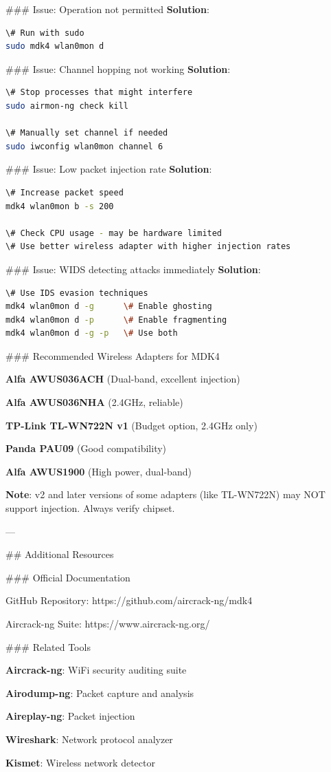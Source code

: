 \documentclass[11pt,a4paper]{article}
\begin{document}
\#\#\# Issue: Operation not permitted
\textbf{Solution}:
\begin{lstlisting}[language=bash]
\# Run with sudo
sudo mdk4 wlan0mon d
\end{lstlisting}

\#\#\# Issue: Channel hopping not working
\textbf{Solution}:
\begin{lstlisting}[language=bash]
\# Stop processes that might interfere
sudo airmon-ng check kill

\# Manually set channel if needed
sudo iwconfig wlan0mon channel 6
\end{lstlisting}

\#\#\# Issue: Low packet injection rate
\textbf{Solution}:
\begin{lstlisting}[language=bash]
\# Increase packet speed
mdk4 wlan0mon b -s 200

\# Check CPU usage - may be hardware limited
\# Use better wireless adapter with higher injection rates
\end{lstlisting}

\#\#\# Issue: WIDS detecting attacks immediately
\textbf{Solution}:
\begin{lstlisting}[language=bash]
\# Use IDS evasion techniques
mdk4 wlan0mon d -g      \# Enable ghosting
mdk4 wlan0mon d -p      \# Enable fragmenting
mdk4 wlan0mon d -g -p   \# Use both
\end{lstlisting}

\#\#\# Recommended Wireless Adapters for MDK4
\item \textbf{Alfa AWUS036ACH} (Dual-band, excellent injection)
\item \textbf{Alfa AWUS036NHA} (2.4GHz, reliable)
\item \textbf{TP-Link TL-WN722N v1} (Budget option, 2.4GHz only)
\item \textbf{Panda PAU09} (Good compatibility)
\item \textbf{Alfa AWUS1900} (High power, dual-band)

\textbf{Note}: v2 and later versions of some adapters (like TL-WN722N) may NOT support injection. Always verify chipset.

---

\#\# Additional Resources

\#\#\# Official Documentation
\item GitHub Repository: https://github.com/aircrack-ng/mdk4
\item Aircrack-ng Suite: https://www.aircrack-ng.org/

\#\#\# Related Tools
\item \textbf{Aircrack-ng}: WiFi security auditing suite
\item \textbf{Airodump-ng}: Packet capture and analysis
\item \textbf{Aireplay-ng}: Packet injection
\item \textbf{Wireshark}: Network protocol analyzer
\item \textbf{Kismet}: Wireless network detector
\end{document}
